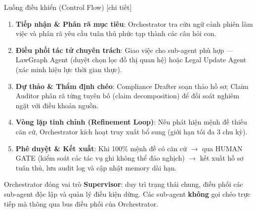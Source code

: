 \documentclass[aspectratio=169,10pt]{beamer}
\begin{document}
\begin{frame}{Luồng điều khiển (Control Flow) [chi tiết]}
\footnotesize
\begin{enumerate}
  \item \textbf{Tiếp nhận \& Phân rã mục tiêu}: Orchestrator tra cứu ngữ cảnh phiên làm việc và phân rã yêu cầu tuân thủ phức tạp thành các câu hỏi con.
  \item \textbf{Điều phối tác tử chuyên trách}: Giao việc cho sub-agent phù hợp --- LawGraph Agent (duyệt chọn lọc đồ thị quan hệ) hoặc Legal Update Agent (xác minh hiệu lực thời gian thực).
  \item \textbf{Dự thảo \& Thẩm định chéo}: Compliance Drafter soạn thảo hồ sơ; Claim Auditor phân rã từng tuyên bố (claim decomposition) để đối soát nghiêm ngặt với điều khoản nguồn.
  \item \textbf{Vòng lặp tinh chỉnh (Refinement Loop)}: Nếu phát hiện mệnh đề thiếu căn cứ, Orchestrator kích hoạt truy xuất bổ sung (giới hạn tối đa 3 chu kỳ).
  \item \textbf{Phê duyệt \& Kết xuất}: Khi 100\% mệnh đề có căn cứ $\rightarrow$ qua HUMAN GATE (kiểm soát các tác vụ ghi không thể đảo nghịch) $\rightarrow$ kết xuất hồ sơ tuân thủ, lưu audit log và cập nhật memory dài hạn.
\end{enumerate}
\vskip0.15cm
{\scriptsize Orchestrator đóng vai trò \textbf{Supervisor}: duy trì trạng thái chung, điều phối các sub-agent độc lập và quản lý điều kiện dừng. Các sub-agent \textbf{không} gọi chéo trực tiếp mà thông qua bus điều phối của Orchestrator.}
\end{frame}
\end{document}
